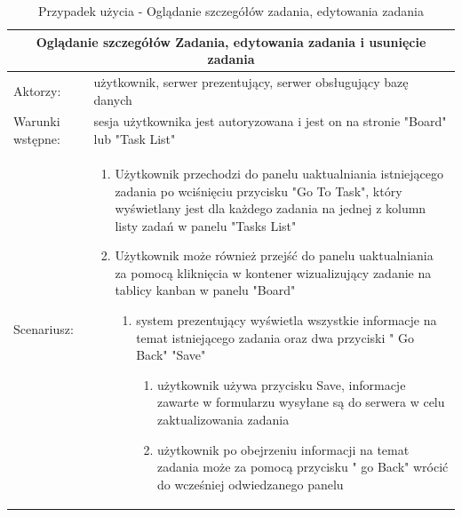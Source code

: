 \begin{table}[h!]
		
	\begin{tabular}{ |p{2cm}||p{13cm}|  }
		
		\hline
		\multicolumn{2}{|c|}{Oglądanie szczegółów Zadania, edytowania zadania i usunięcie zadania} \\
		\hline
Aktorzy: &użytkownik, serwer prezentujący, serwer obsługujący bazę danych\\
		\hline
Warunki wstępne: & sesja użytkownika jest autoryzowana i jest on na stronie "Board" lub "Task List"\\
		\hline
		Scenariusz: &
		
		\begin{enumerate}


	\item Użytkownik przechodzi do panelu uaktualniania istniejącego zadania po wciśnięciu przycisku "Go To Task", który wyświetlany jest dla każdego zadania na jednej z kolumn  listy zadań w panelu "Tasks List" 
	\item Użytkownik może również przejść do panelu uaktualniania za pomocą kliknięcia w kontener wizualizujący zadanie na tablicy kanban w panelu "Board"
		\begin{enumerate}
		\item system prezentujący wyświetla wszystkie informacje na temat istniejącego zadania oraz dwa przyciski " Go Back" "Save"

		\begin{enumerate}
			\item użytkownik używa przycisku Save, informacje zawarte w formularzu wysyłane są do serwera w celu zaktualizowania zadania

			\item użytkownik po obejrzeniu informacji na temat zadania może za pomocą przycisku " go Back" wrócić do wcześniej odwiedzanego panelu
		\end{enumerate}
	\end{enumerate}
\end{enumerate}\\
\hline
\end{tabular}
\caption{Przypadek użycia - Oglądanie szczegółów zadania, edytowania zadania}
\end{table}

